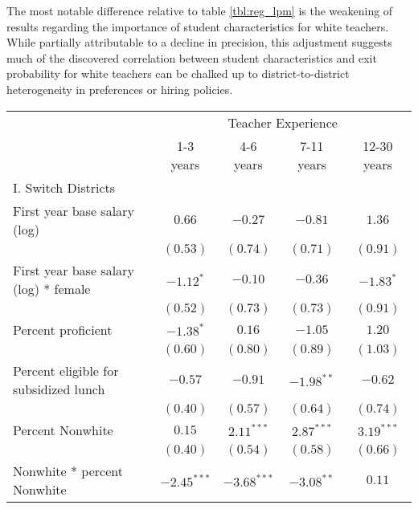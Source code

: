 \documentclass[12pt,]{article}
\begin{document}
The most notable difference relative to table \ref{tbl:reg_lpm} is the
weakening of results regarding the importance of student characteristics
for white teachers. While partially attributable to a decline in
precision, this adjustment suggests much of the discovered correlation
between student characteristics and exit probability for white teachers
can be chalked up to district-to-district heterogeneity in preferences
or hiring policies.

\begin{sidewaystable}
\begin{center}
\begin{tabular}{l c c c c }
\hline
 & \multicolumn{4}{c}{Teacher Experience} \\ \cline{2-5}
 & 1-3 years & 4-6 years & 7-11 years & 12-30 years \\
\hline
I. Switch Districts                             &               &               &               &              \\
\quad First year base salary (log)           & $0.66$        & $-0.27$       & $-0.81$       & $1.36$       \\
                                                & $(0.53)$      & $(0.74)$      & $(0.71)$      & $(0.91)$     \\
\quad First year base salary (log) * female  & $-1.12^{*}$   & $-0.10$       & $-0.36$       & $-1.83^{*}$  \\
                                                & $(0.52)$      & $(0.73)$      & $(0.73)$      & $(0.91)$     \\
\quad Percent proficient                     & $-1.38^{*}$   & $0.16$        & $-1.05$       & $1.20$       \\
                                                & $(0.60)$      & $(0.80)$      & $(0.89)$      & $(1.03)$     \\
\quad Percent eligible for subsidized lunch  & $-0.57$       & $-0.91$       & $-1.98^{**}$  & $-0.62$      \\
                                                & $(0.40)$      & $(0.57)$      & $(0.64)$      & $(0.74)$     \\
\quad Percent Nonwhite                       & $0.15$        & $2.11^{***}$  & $2.87^{***}$  & $3.19^{***}$ \\
                                                & $(0.40)$      & $(0.54)$      & $(0.58)$      & $(0.66)$     \\
\quad Nonwhite * percent Nonwhite            & $-2.45^{***}$ & $-3.68^{***}$ & $-3.08^{**}$  & $0.11$       \\

\end{tabular}
\end{center}
\end{sidewaystable}
\end{document}
